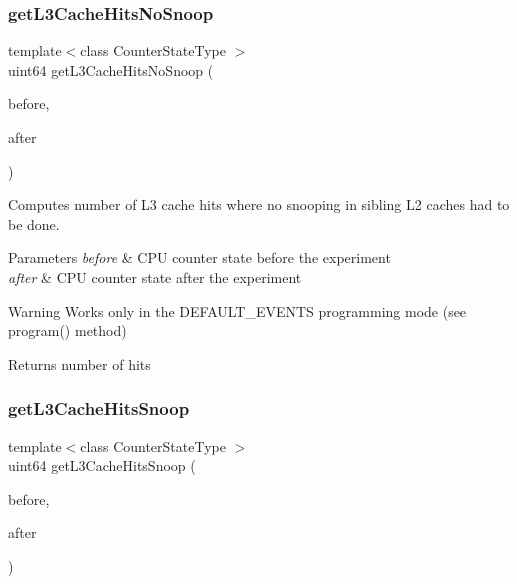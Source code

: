 \subsubsection{\texorpdfstring{get\+L3\+Cache\+Hits\+No\+Snoop}{getL3CacheHitsNoSnoop}}
{\footnotesize\ttfamily template$<$class Counter\+State\+Type $>$ \\
uint64 get\+L3\+Cache\+Hits\+No\+Snoop (\begin{DoxyParamCaption}\item[{const Counter\+State\+Type \&}]{before,  }\item[{const Counter\+State\+Type \&}]{after }\end{DoxyParamCaption})\hspace{0.3cm}{\ttfamily [friend]}}



Computes number of L3 cache hits where no snooping in sibling L2 caches had to be done. 


\begin{DoxyParams}{Parameters}
{\em before} & C\+PU counter state before the experiment \\
\hline
{\em after} & C\+PU counter state after the experiment \\
\hline
\end{DoxyParams}
\begin{DoxyWarning}{Warning}
Works only in the D\+E\+F\+A\+U\+L\+T\+\_\+\+E\+V\+E\+N\+TS programming mode (see program() method) 
\end{DoxyWarning}
\begin{DoxyReturn}{Returns}
number of hits 
\end{DoxyReturn}
\mbox{\label{class_basic_counter_state_a4b1050ca9ccdd66661df556bab70fd0f}} 
\subsubsection{\texorpdfstring{get\+L3\+Cache\+Hits\+Snoop}{getL3CacheHitsSnoop}}
{\footnotesize\ttfamily template$<$class Counter\+State\+Type $>$ \\
uint64 get\+L3\+Cache\+Hits\+Snoop (\begin{DoxyParamCaption}\item[{const Counter\+State\+Type \&}]{before,  }\item[{const Counter\+State\+Type \&}]{after }\end{DoxyParamCaption})\hspace{0.3cm}{\ttfamily [friend]}}



